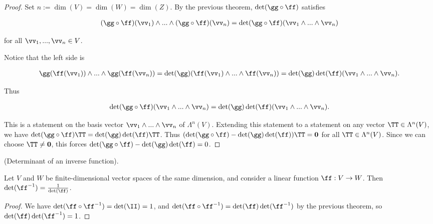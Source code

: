\begin{proof}
   Set $n := \dim(V) = \dim(W) = \dim(Z)$. By the previous theorem, $\det(\gg \circ \ff)$ satisfies
   
   \begin{align*}
       (\gg \circ \ff)(\vv_1) \wedge ... \wedge (\gg \circ \ff)(\vv_n) = \det(\gg \circ \ff) (\vv_1 \wedge ... \wedge \vv_n)
   \end{align*}
   
   for all $\vv_1, ..., \vv_n \in V$.
   
   Notice that the left side is
   
   \begin{align*}
       \gg(\ff(\vv_1)) \wedge ... \wedge \gg(\ff(\vv_n)) = \det(\gg) (\ff(\vv_1) \wedge ... \wedge \ff(\vv_n)) =
       \det(\gg) \det(\ff) (\vv_1 \wedge ... \wedge \vv_n).
   \end{align*}
   
   Thus
   
   \begin{align*}
       \det(\gg \circ \ff) (\vv_1 \wedge ... \wedge \vv_n) = \det(\gg) \det(\ff) (\vv_1 \wedge ... \wedge \vv_n).
   \end{align*}
   
   This is a statement on the basis vector $\vv_1 \wedge ... \wedge \vv_n$ of $\Lambda^n(V)$. Extending this statement to a statement on any vector $\TT \in \Lambda^n(V)$, we have $\det(\gg \circ \ff) \TT = \det(\gg) \det(\ff) \TT$. Thus ${(\det(\gg \circ \ff) - \det(\gg) \det(\ff)) \TT = \mathbf{0}}$ for all $\TT \in \Lambda^n(V)$. Since we can choose $\TT \neq \mathbf{0}$, this forces $\det(\gg \circ \ff) - \det(\gg) \det(\ff) = 0$.
\end{proof}

\begin{theorem}
    (Determinant of an inverse function).
    
    Let $V$ and $W$ be finite-dimensional vector spaces of the same dimension, and consider a linear function $\ff:V \rightarrow W$. Then $\det(\ff^{-1}) = \frac{1}{\det(\ff)}$.
\end{theorem}

\begin{proof}
   We have $\det(\ff \circ \ff^{-1}) = \det(\II) = 1$, and $\det(\ff \circ \ff^{-1}) = \det(\ff) \det(\ff^{-1})$ by the previous theorem, so $\det(\ff) \det(\ff^{-1}) = 1$.
\end{proof}


